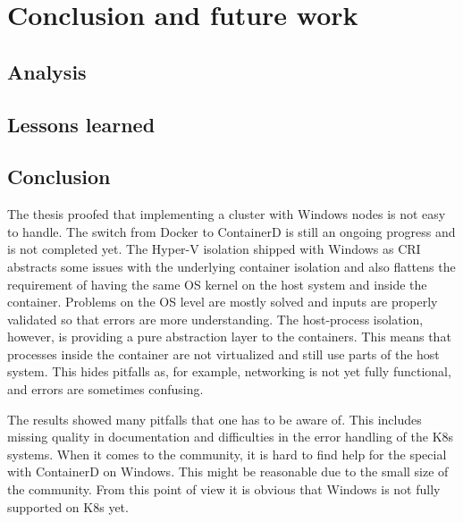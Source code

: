 
\chapter{Conclusion and future work} %

\label{chap:conclusion} %


\section{Analysis}


\section{Lessons learned}

\section{Conclusion}
The thesis proofed that implementing a cluster with \ac{Windows} nodes is not easy to handle. The switch from Docker to ContainerD is still an ongoing progress and is not completed yet.
The Hyper-V isolation shipped with \ac{Windows} as \ac{CRI} abstracts some issues with the underlying container isolation and also flattens the requirement of having the same \ac{OS} kernel on the host system and inside the container. Problems on the \ac{OS} level are mostly solved and inputs are properly validated so that errors are more understanding.
The host-process isolation, however, is providing a pure abstraction layer to the containers. This means that processes inside the container are not virtualized and still use parts of the host system.
This hides pitfalls as, for example, networking is not yet fully functional, and errors are sometimes confusing.

The results showed many pitfalls that one has to be aware of. This includes missing quality in documentation and difficulties in the error handling of the \ac{K8s} systems. When it comes to the community, it is hard to find help for the special with ContainerD on \ac{Windows}. This might be reasonable due to the small size of the community. From this point of view it is obvious that \ac{Windows} is not fully supported on \ac{K8s} yet.


